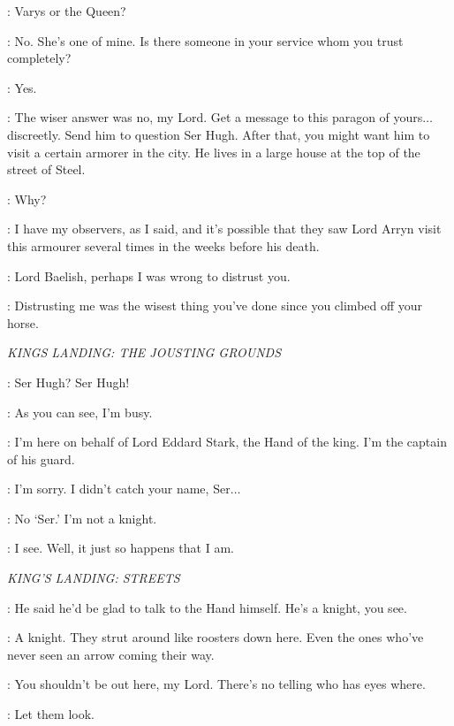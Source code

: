 \NED: Varys or the Queen? 

\LITTLEFINGER: No. She's one of mine. Is there someone in your service whom you trust completely? 

\NED: Yes. 

\LITTLEFINGER: The wiser answer was no, my Lord. Get a message to this paragon of yours$\ldots$ discreetly. Send him to question Ser Hugh. After that, you might want him to visit a certain armorer in the city. He lives in a large house at the top of the street of Steel. 

\NED: Why? 

\LITTLEFINGER: I have my observers, as I said, and it's possible that they saw Lord Arryn visit this armourer several times in the weeks before his death. 

\NED: Lord Baelish, perhaps I was wrong to distrust you. 

\LITTLEFINGER: Distrusting me was the wisest thing you've done since you climbed off your horse. 

\scene

\textit{KINGS LANDING: THE JOUSTING GROUNDS}

\JORY: Ser Hugh? Ser Hugh! 

\SERHUGH: As you can see, I'm busy. 

\JORY: I'm here on behalf of Lord Eddard Stark, the Hand of the king. I'm the captain of his guard. 

\SERHUGH: I'm sorry. I didn't catch your name, Ser$\ldots$ 

\JORY: No `Ser.' I'm not a knight. 

\SERHUGH: I see. Well, it just so happens that I am. 

\scene

\textit{KING'S LANDING: STREETS}


\JORY: He said he'd be glad to talk to the Hand himself. He's a knight, you see. 

\NED: A knight. They strut around like roosters down here. Even the ones who've never seen an arrow coming their way. 

\JORY: You shouldn't be out here, my Lord. There's no telling who has eyes where. 

\NED: Let them look. 


